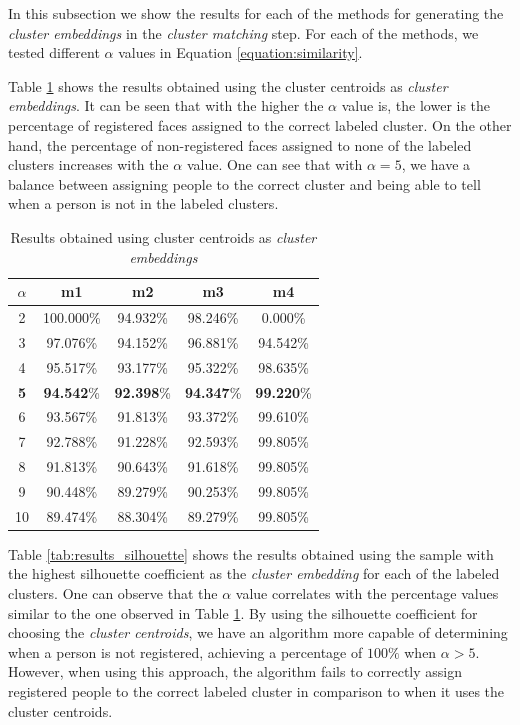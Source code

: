 In this subsection we show the results for each of the methods for generating the \emph{cluster embeddings} in the \emph{cluster matching} step.
For each of the methods, we tested different $\alpha$ values in Equation \ref{equation:similarity}.

Table \ref{tab:results_centroid} shows the results obtained using the cluster centroids as \emph{cluster embeddings}.
It can be seen that with the higher the $\alpha$ value is, the lower is the percentage of registered faces assigned to the correct labeled cluster.
On the other hand, the percentage of non-registered faces assigned to none of the labeled clusters increases with the $\alpha$ value.
One can see that with $\alpha = 5$, we have a balance between assigning people to the correct cluster and being able to tell when a person is not in the labeled clusters.

\begin{table}[!ht]
\centering
\small
\caption{Results obtained using cluster centroids as \emph{cluster embeddings}}
\label{tab:results_centroid}
\begin{tabular}{ccccc}
\hline
\textbf{$\alpha$} & \textbf{m1} & \textbf{m2} & \textbf{m3} & \textbf{m4} \\ \hline
2 & 100.000\% & 94.932\% & 98.246\% & 0.000\% \\
3 & 97.076\% & 94.152\% & 96.881\% & 94.542\% \\
4 & 95.517\% & 93.177\% & 95.322\% & 98.635\% \\
\textbf{5} & \textbf{94.542}\% & \textbf{92.398}\% & \textbf{94.347}\% & \textbf{99.220}\% \\
6 & 93.567\% & 91.813\% & 93.372\% & 99.610\% \\
7 & 92.788\% & 91.228\% & 92.593\% & 99.805\% \\
8 & 91.813\% & 90.643\% & 91.618\% & 99.805\% \\
9 & 90.448\% & 89.279\% & 90.253\% & 99.805\% \\
10 & 89.474\% & 88.304\% & 89.279\% & 99.805\%
\end{tabular}
\end{table}

Table \ref{tab:results_silhouette} shows the results obtained using the sample with the highest silhouette coefficient as the \emph{cluster embedding} for each of the labeled clusters.
One can observe that the $\alpha$ value correlates with the percentage values similar to the one observed in Table \ref{tab:results_centroid}.
By using the silhouette coefficient for choosing the \emph{cluster centroids}, we have an algorithm more capable of determining when a person is not registered, achieving a percentage of $100\%$ when $\alpha>5$.
However, when using this approach, the algorithm fails to correctly assign registered people to the correct labeled cluster in comparison to when it uses the cluster centroids.

